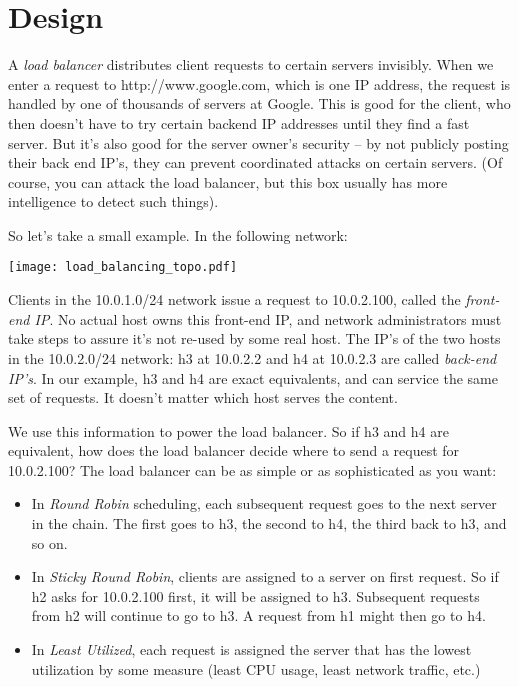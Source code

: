 \section{Design}

A \emph{load balancer} distributes client requests to certain servers invisibly.  When
we enter a request to http://www.google.com, which is one IP address, the request is handled
by one of thousands of servers at Google.  This is good for the client, who then doesn't have to 
try certain backend IP addresses until they find a fast server.  But it's also good for the 
server owner's security -- by not publicly posting their back end IP's, they can prevent 
coordinated attacks on certain servers.  (Of course, you can attack the load balancer, but 
this box usually has more intelligence to detect such things).  

So let's take a small example.  In the following network:

\texttt{[image: load\_balancing\_topo.pdf]}

Clients in the 10.0.1.0/24 network issue a request to 10.0.2.100, called the \emph{front-end IP}.
No actual host owns this front-end IP, and network administrators must take steps to assure
it's not re-used by some real host.  The IP's of the two hosts in the 10.0.2.0/24 network: 
h3 at 10.0.2.2 and h4 at 10.0.2.3 are called \emph{back-end IP's}.  In our example,
h3 and h4 are exact equivalents, and can service the same set of requests.  It doesn't matter
which host serves the content.  

We use this information to power the load balancer.  So if h3 and h4 are equivalent, how
does the load balancer decide where to send a request for 10.0.2.100?  The load balancer
can be as simple or as sophisticated as you want:

\begin{itemize}
\item In \emph{Round Robin} scheduling, each subsequent request goes to the next server in the 
chain.  The first goes to h3, the second to h4, the third back to h3, and so on.  
\item In \emph{Sticky Round Robin}, clients are assigned to a server on first request.  So 
if h2 asks for 10.0.2.100 first, it will be assigned to h3.  Subsequent requests from h2
will continue to go to h3.  A request from h1 might then go to h4.  
\item In \emph{Least Utilized}, each request is assigned the server that has the lowest 
utilization by some measure (least CPU usage, least network traffic, etc.)
\end{itemize}


